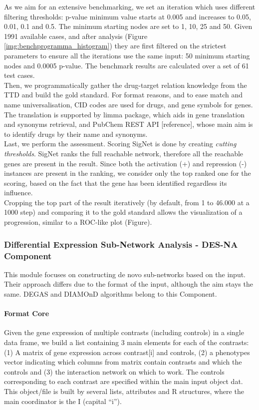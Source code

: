 As we aim for an extensive benchmarking, we set an iteration which uses different filtering thresholds: p-value minimum value starts at 0.005 and increases to 0.05, 0.01, 0.1 and 0.5. The minimum starting nodes are set to 1, 10, 25 and 50. Given 1991 available cases, and after analysis (Figure \ref{img:benchprogramma_histogram}) they are first filtered on the strictest parameters to ensure all the iterations use the same input: 50 minimum starting nodes and 0.0005 p-value. The benchmark results are calculated over a set of 61 test cases.
\\

Then, we programmatically gather the drug-target relation knowledge from the TTD and build the gold standard. For format reasons, and to ease match and name universalisation, CID codes are used for drugs, and gene symbols for genes. The translation is supported by limma package, which aids in gene translation and synonyms retrieval, and PubChem REST API [reference], whose main aim is to identify drugs by their name and synonyms.
\\

Last, we perform the assessment. Scoring SigNet is done by creating \textit{cutting thresholds}. SigNet ranks the full reachable network, therefore all the reachable genes are present in the result. Since both the activation (+) and repression (-) instances are present in the ranking, we consider only the top ranked one for the scoring, based on the fact that the gene has been identified regardless its influence.
\\

Cropping the top part of the result iteratively (by default, from 1 to 46.000 at a 1000 step) and comparing it to the gold standard allows the visualization of a progression, similar to a ROC-like plot (Figure).
\\

\subsubsection{Differential Expression Sub-Network Analysis - DES-NA Component}

This module focuses on constructing de novo sub-networks based on the input. Their approach differs due to the format of the input, although the aim stays the same. DEGAS and DIAMOnD algorithms belong to this Component.

\paragraph{Format Core}
Given the gene expression of multiple contrasts (including controls) in a single data frame, we build a list containing 3 main elements for each of the contrasts: (1) A matrix of gene expression across contrast[i] and controls, (2) a phenotypes vector indicating which columns from matrix contain contrasts and which the controls and (3) the interaction network on which to work.
The controls corresponding to each contrast are specified within the main input object dat. This object/file is built by several lists, attributes and R structures, where the main coordinator is the I (capital “i”).

